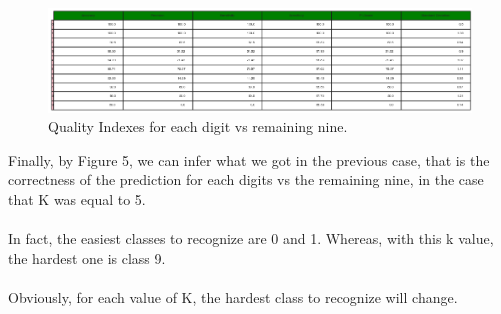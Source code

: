 \documentclass[10pt]{article}
\begin{document}
\begin{figure}[h] 
	\centering
	\includegraphics[width=1.0\columnwidth]{Figure_5.png} %
	\caption{Quality Indexes for each digit vs remaining nine.}
\end{figure}

Finally, by Figure 5, we can infer what we got in the previous case, that is the correctness of the prediction for each digits vs the remaining nine, in the case that K was equal to 5.
\\\\
In fact, the easiest classes to recognize are 0 and 1. Whereas, with this k value, the hardest one is class 9.
\\\\
Obviously, for each value of K, the hardest class to recognize will change.
\end{document}
